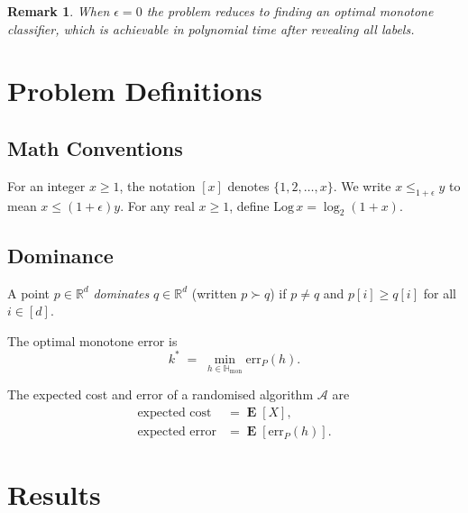 \documentclass[11pt, a4paper]{article}
\theoremstyle{boxed}
\newtheorem{innerremark}{Remark}[section]
\newenvironment{remark}
  {\begin{mdframed}[style=notestyle]\begin{innerremark}}
  {\end{innerremark}\end{mdframed}}
\newcommand{\R}{\mathbb{R}}
\newcommand{\Hmon}{\mathbb{H}_{\mathrm{mon}}}
\newcommand{\err}{\mathrm{err}}
\DeclareMathOperator{\E}{\mathbf{E}}
\newcommand{\kstar}{k^{*}}
\newcommand{\dom}{\succ}        %
\begin{document}
\begin{remark}
  When $\epsilon = 0$ the problem reduces to finding an \emph{optimal}
  monotone classifier, which is achievable in polynomial time after
  revealing all labels.
\end{remark}

\section{Problem Definitions}

\subsection{Math Conventions}

For an integer $x \ge 1$, the notation $[x]$ denotes $\{1, 2, \ldots, x\}$.
We write $x \le_{1+\epsilon} y$ to mean $x \le (1+\epsilon)y$.
For any real $x \ge 1$, define $\mathrm{Log}\, x = \log_2(1+x)$.

\subsection{Dominance}

A point $p \in \R^d$ \emph{dominates} $q \in \R^d$ (written $p \dom q$) if
$p \ne q$ and $p[i] \ge q[i]$ for all $i \in [d]$.

The optimal monotone error is
\begin{equation}\label{eq:kstar}
  \kstar \;=\; \min_{h \in \Hmon} \err_P(h).
\end{equation}

The expected cost and error of a randomised algorithm $\mathcal{A}$ are
\begin{align}
  \text{expected cost}  &= \E[X], \label{eq:cost}\\
  \text{expected error} &= \E[\err_P(h)]. \label{eq:error}
\end{align}

\section{Results}
\end{document}
